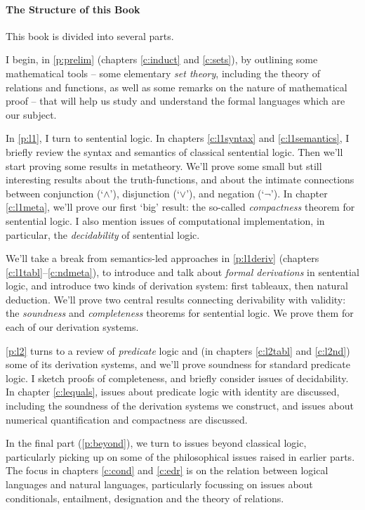 \documentclass[openany,leqno,10pt]{book}
\theoremstyle{break}
\theoremstyle{definition}
\theoremstyle{remark}
\begin{document}
\paragraph{The Structure of this Book} This book is divided into several parts.

I begin, in \autoref{p:prelim} (chapters \ref{c:induct} and \ref{c:sets}), by outlining some mathematical tools – some elementary \emph{set theory}, including the theory of relations and  functions, as well as some remarks on the nature of mathematical proof – that will help us study and understand the formal languages which are our subject. 

In \autoref{p:l1}, I turn to sentential logic. In chapters \ref{c:l1syntax} and \ref{c:l1semantics}, I briefly review the syntax and semantics of classical sentential logic. Then we'll start proving some results in metatheory. We'll prove some small but still interesting results about the truth-functions, and about the intimate connections between conjunction (‘$\wedge$’), disjunction (‘$\vee$’), and negation (‘$¬$’). In chapter \ref{c:l1meta}, we'll prove our first `big' result: the so-called \emph{compactness} theorem for sentential logic. I also mention issues of computational implementation, in particular, the \emph{decidability} of sentential logic. 

We'll take a break from semantics-led approaches in \autoref{p:l1deriv} (chapters \ref{c:l1tabl}–\ref{c:ndmeta}), to introduce and talk about \emph{formal derivations} in sentential logic, and introduce two kinds of derivation system: first tableaux, then natural deduction. We'll prove two central results connecting derivability with validity: the \emph{soundness} and \emph{completeness} theorems for sentential logic. We prove them for each of our derivation systems. 

\autoref{p:l2} turns to a review of \emph{predicate} logic and (in chapters \ref{c:l2tabl} and \ref{c:l2nd}) some of its derivation systems, and we'll prove soundness for standard predicate logic. I sketch proofs of completeness, and briefly consider issues of decidability. In chapter \ref{c:lequals}, issues about predicate logic with identity are discussed, including the soundness of the derivation systems we construct, and issues about numerical quantification and compactness are discussed. 

In the final part (\ref{p:beyond}), we turn to issues beyond classical logic, particularly picking up on some of the philosophical issues raised in earlier parts. 
The focus in chapters \ref{c:cond} and \ref{c:edr} is on the relation between logical languages and natural languages, particularly focussing on issues about conditionals, entailment, designation and the theory of relations.
\end{document}
